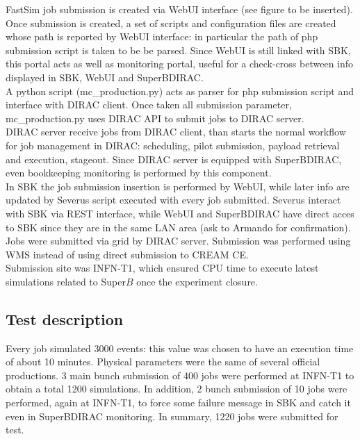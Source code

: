 \documentclass[a4paper]{jpconf}
\begin{document}
FastSim job submission is created via WebUI interface (see figure to be inserted). Once submission is created, a set of scripts and configuration files are created whose path is reported by WebUI interface: in particular the path of php submission script is taken to be be parsed. Since WebUI is still linked with SBK, this portal acts as well as monitoring portal, useful for a check-cross between info displayed in SBK, WebUI and SuperBDIRAC.\\

A python script (mc\_production.py) acts as parser for php submission script and interface with DIRAC client. Once taken all submission parameter, mc\_production.py uses DIRAC API to submit jobs to DIRAC server.\\

DIRAC server receive jobs from DIRAC client, than starts the normal workflow for job management in DIRAC: scheduling, pilot submission, payload retrieval and execution, stageout. Since DIRAC server is equipped with SuperBDIRAC, even bookkeeping monitoring is performed by this component.\\

In SBK the job submission insertion is performed by WebUI, while later info are updated by Severus script executed with every job submitted. Severus interact with SBK via REST interface, while WebUI and SuperBDIRAC have direct acces to SBK since they are in the same LAN area (ask to Armando for confirmation).\\

Jobs were submitted via grid by DIRAC server. Submission was performed using WMS instead of using direct submission to CREAM CE.\\

Submission site was INFN-T1, which ensured CPU time to execute latest simulations related to Super$B$ once the experiment closure.

\subsection{Test description}

Every job simulated 3000 events: this value was chosen to have an execution time of about 10 minutes.
Physical parameters were the same of several official productions.
3 main bunch submission of 400 jobs were performed at INFN-T1 to obtain a total 1200 simulations.
In addition, 2 bunch submission of 10 jobs were performed, again at INFN-T1, to force some failure message in SBK and catch it even in SuperBDIRAC monitoring. In summary, 1220 jobs were submitted for test.\\
\end{document}
